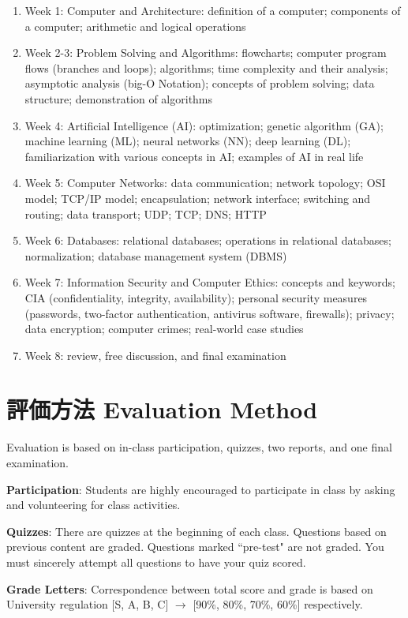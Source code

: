 \documentclass{article}
\begin{document}
\begin{enumerate}
	\item Week 1: Computer and Architecture: definition of a computer; components of a computer; arithmetic and logical operations
	\item Week 2-3: Problem Solving and Algorithms: flowcharts; computer program flows (branches and loops); algorithms; time complexity and their analysis; asymptotic analysis (big-O Notation); concepts of problem solving; data structure; demonstration of algorithms
	\item Week 4: Artificial Intelligence (AI): optimization; genetic algorithm (GA); machine learning (ML); neural networks (NN); deep learning (DL); familiarization with various concepts in AI; examples of AI in real life
	\item Week 5: Computer Networks: data communication; network topology; OSI model; TCP/IP model; encapsulation; network interface; switching and routing; data transport; UDP; TCP; DNS; HTTP
	\item Week 6: Databases: relational databases; operations in relational databases; normalization; database management system (DBMS)
	\item Week 7: Information Security and Computer Ethics: concepts and keywords; CIA (confidentiality, integrity, availability); personal security measures (passwords, two-factor authentication, antivirus software, firewalls); privacy; data encryption; computer crimes; real-world case studies
	\item Week 8: review, free discussion, and final examination
\end{enumerate}

\section{評価方法 Evaluation Method}
Evaluation is based on in-class participation, quizzes, two reports, and one final examination.

\smallskip\noindent
\textbf{Participation}: Students are highly encouraged to participate in class by asking and volunteering for class activities.

\smallskip\noindent
\textbf{Quizzes}: There are quizzes at the beginning of each class. Questions based on previous content are graded. Questions marked ``pre-test" are not graded. You must sincerely attempt all questions to have your quiz scored.

\smallskip\noindent
\textbf{Grade Letters}: Correspondence between total score and grade is based on University regulation [S, A, B, C] $\rightarrow$ [90\%, 80\%, 70\%, 60\%] respectively.
\end{document}
